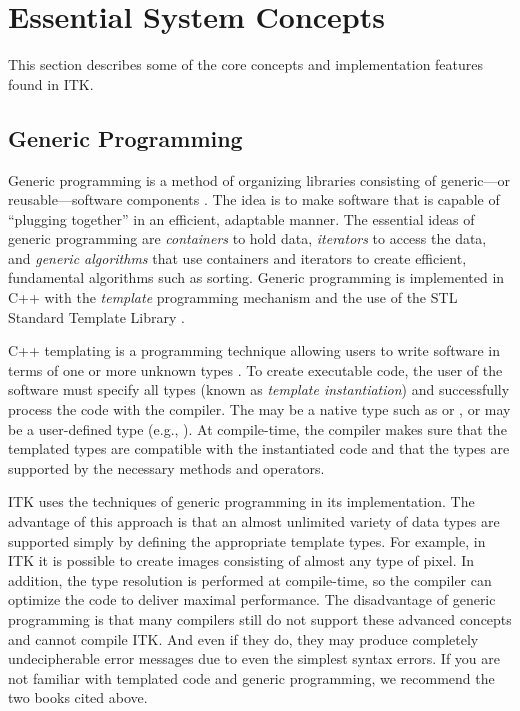 \section{Essential System Concepts}
\label{sec:EssentialSystemConcepts}

This section describes some of the core concepts and implementation features
found in ITK.

\subsection{Generic Programming}
\label{sec:GenericProgramming}

Generic programming is a method of organizing libraries consisting of
generic---or reusable---software components \cite{Musser1996}. The idea is to
make software that is capable of ``plugging together'' in an efficient,
adaptable manner. The essential ideas of generic programming are
\emph{containers} to hold data, \emph{iterators} to access the data, and 
\emph{generic algorithms} that use containers and iterators to create 
efficient, fundamental algorithms such as sorting. Generic programming is
implemented in C++ with the \emph{template} programming mechanism and the 
use of the STL Standard Template Library \cite{Austern1999}.

C++ templating is a programming technique allowing users to write software in
terms of one or more unknown types . To create executable code, the
user of the software must specify all types  (known as \emph{template
instantiation}) and successfully process the code with the compiler. The
 may be a native type such as
 or , or  may be a user-defined type (e.g.,
). At compile-time, the compiler makes sure that the templated 
types are compatible with the instantiated code and that the types are
supported by the necessary methods and operators.

ITK uses the techniques of generic programming in its implementation. The
advantage of this approach is that an almost unlimited variety of data types
are supported simply by defining the appropriate template types. For example,
in ITK it is possible to create images consisting of almost any type of
pixel. In addition, the type resolution is performed at compile-time, so the
compiler can optimize the code to deliver maximal performance. The
disadvantage of generic programming is that many compilers still do not
support these advanced concepts and cannot compile ITK. And even if they do,
they may produce completely undecipherable error messages due to even the
simplest syntax errors. If you are not familiar with templated code and
generic programming, we recommend the two books cited above.

